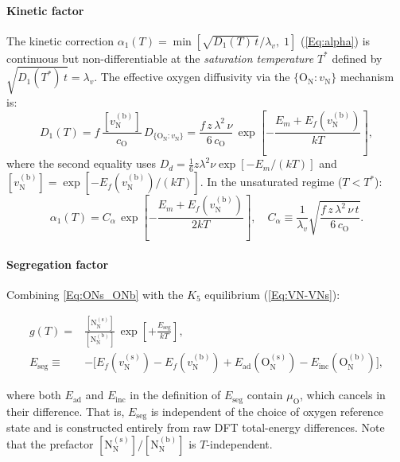 \documentclass[preprint,12pt,sort&compress]{elsarticle}
\newcommand{\?}{\stackrel{?}{=}}
\begin{document}
\paragraph{Kinetic factor} The kinetic correction $\alpha_1(T) = \min[\sqrt{D_1(T)\,t}/\lambda_v,\; 1]$ (\cref{Eq:alpha}) is continuous but non-differentiable at the \emph{saturation temperature} $T^*$ defined by $\sqrt{D_1(T^*)\,t} = \lambda_v$. The effective oxygen diffusivity via the $\{\text{O}_\text{N} : v_\text{N}\}$ mechanism is:
\begin{equation}
D_1(T) = f\,\frac{[v_\text{N}^{(\text{b})}]}{c_\text{O}}\,D_{\{\text{O}_\text{N}:v_\text{N}\}} = \frac{f\,z\,\lambda^2\,\nu}{6\,c_\text{O}}\,\exp\!\left[-\frac{E_m + E_f(v_\text{N}^{(\text{b})})}{kT}\right],
\label{Eq:App:D1}
\end{equation}
where the second equality uses $D_d = \frac{1}{6}z\lambda^2\nu\exp[-E_m/(kT)]$ and $[v_\text{N}^{(\text{b})}] = \exp[-E_f(v_\text{N}^{(\text{b})})/(kT)]$. In the unsaturated regime ($T < T^*$):
\begin{equation}
\alpha_1(T) = C_\alpha\,\exp\!\left[-\frac{E_m + E_f(v_\text{N}^{(\text{b})})}{2kT}\right], \quad C_\alpha \equiv \frac{1}{\lambda_v}\sqrt{\frac{f\,z\,\lambda^2\,\nu\,t}{6\,c_\text{O}}}.
\label{Eq:App:alpha1Unsat}
\end{equation}

\paragraph{Segregation factor} Combining \cref{Eq:ONs_ONb} with the $K_5$ equilibrium (\cref{Eq:VN-VNs}):

\begin{align}
g(T) = & \frac{[\text{N}_\text{N}^{(\text{s})}]}{[\text{N}_\text{N}^{(\text{b})}]}\,\exp\!\left[+\frac{E_\text{seg}}{kT}\right], \\
E_\text{seg} \equiv & -\bigl[E_f(v_\text{N}^{(\text{s})}) - E_f(v_\text{N}^{(\text{b})}) + E_\text{ad}(\text{O}_\text{N}^{(\text{s})}) - E_\text{inc}(\text{O}_\text{N}^{(\text{b})})\bigr],
\label{Eq:App:gT}
\end{align}

where both $E_\text{ad}$ and $E_\text{inc}$ in the definition of $E_\text{seg}$ contain $\mu_\text{O}$, which cancels in their difference. That is, $E_\text{seg}$ is independent of the choice of oxygen reference state and is constructed entirely from raw DFT total-energy differences. Note that the prefactor $[\text{N}_\text{N}^{(\text{s})}]/[\text{N}_\text{N}^{(\text{b})}]$ is $T$-independent.
\end{document}
